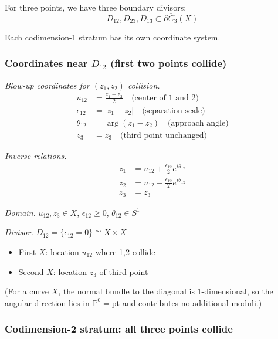 \begin{example}\label{ex:coords-n3}
For three points, we have three boundary divisors:
\[D_{12}, D_{23}, D_{13} \subset \partial\overline{C}_3(X)\]

Each codimension-1 stratum has its own coordinate system.

\subsubsection{\texorpdfstring{Coordinates near $D_{12}$ (first two points collide)}{Coordinates near D 12 (first two points collide)}}

\emph{Blow-up coordinates for $(z_1, z_2)$ collision.}
\begin{align}
u_{12} &= \frac{z_1 + z_2}{2} \quad \text{(center of 1 and 2)}\\
\epsilon_{12} &= |z_1 - z_2| \quad \text{(separation scale)}\\
\theta_{12} &= \arg(z_1 - z_2) \quad \text{(approach angle)}\\
z_3 &= z_3 \quad \text{(third point unchanged)}
\end{align}

\emph{Inverse relations.}
\begin{align}
z_1 &= u_{12} + \frac{\epsilon_{12}}{2} e^{i\theta_{12}}\\
z_2 &= u_{12} - \frac{\epsilon_{12}}{2} e^{i\theta_{12}}\\
z_3 &= z_3
\end{align}

\emph{Domain.} $u_{12}, z_3 \in X$, $\epsilon_{12} \geq 0$, $\theta_{12} \in S^1$

\emph{Divisor.} $D_{12} = \{\epsilon_{12} = 0\} \cong X \times X$
\begin{itemize}
\item First $X$: location $u_{12}$ where 1,2 collide
\item Second $X$: location $z_3$ of third point
\end{itemize}
(For a curve $X$, the normal bundle to the diagonal is $1$-dimensional, so the angular direction lies in $\mathbb{P}^0 = \mathrm{pt}$ and contributes no additional moduli.)

\subsubsection{Codimension-2 stratum: all three points collide}


\end{example}
